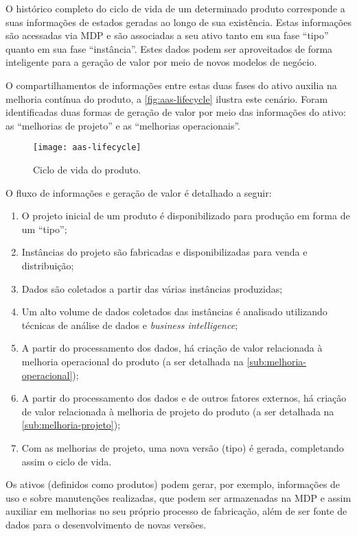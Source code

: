 O histórico completo do ciclo de vida de um determinado produto corresponde a suas informações de estados geradas ao longo de sua existência. Estas informações são acessadas via MDP e são associadas a seu ativo tanto em sua fase ``tipo'' quanto em sua fase ``instância''. Estes dados podem ser aproveitados de forma inteligente para a geração de valor por meio de novos modelos de negócio.

O compartilhamentos de informações entre estas duas fases do ativo auxilia na melhoria contínua do produto, a \autoref{fig:aas-lifecycle} ilustra este cenário. Foram identificadas duas formas de geração de valor por meio das informações do ativo: as ``melhorias de projeto'' e as ``melhorias operacionais''.

\begin{figure}[t]
	\centering
	\texttt{[image: aas-lifecycle]}
	\caption{Ciclo de vida do produto.}
	\label{fig:aas-lifecycle}
\end{figure}

O fluxo de informações e geração de valor é detalhado a seguir:

\begin{enumerate}[label=(\alph*)]
	\item O projeto inicial de um produto é disponibilizado para produção em forma de um ``tipo'';
	\item Instâncias do projeto são fabricadas e disponibilizadas para venda e distribuição;
	\item Dados são coletados a partir das várias instâncias produzidas;
	\item Um alto volume de dados coletados das instâncias é analisado utilizando técnicas de análise de dados e \textit{business intelligence};
	\item A partir do processamento dos dados, há criação de valor relacionada à melhoria operacional do produto (a ser detalhada na \autoref{sub:melhoria-operacional});
	\item A partir do processamento dos dados e de outros fatores externos, há criação de valor relacionada à melhoria de projeto do produto (a ser detalhada na \autoref{sub:melhoria-projeto});
	\item Com as melhorias de projeto, uma nova versão (tipo) é gerada, completando assim o ciclo de vida.
\end{enumerate}

Os ativos (definidos como produtos) podem gerar, por exemplo, informações de uso e sobre manutenções realizadas, que podem ser armazenadas na MDP e assim auxiliar em melhorias no seu próprio processo de fabricação, além de ser fonte de dados para o desenvolvimento de novas versões.

